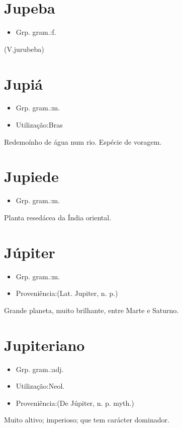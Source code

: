 \documentclass{article}
\begin{document}
\section{Jupeba}
\begin{itemize}
\item {Grp. gram.:f.}
\end{itemize}
(V.jurubeba)
\section{Jupiá}
\begin{itemize}
\item {Grp. gram.:m.}
\end{itemize}
\begin{itemize}
\item {Utilização:Bras}
\end{itemize}
Redemoínho de água num rio.
Espécie de voragem.
\section{Jupiede}
\begin{itemize}
\item {Grp. gram.:m.}
\end{itemize}
Planta resedácea da Índia oriental.
\section{Júpiter}
\begin{itemize}
\item {Grp. gram.:m.}
\end{itemize}
\begin{itemize}
\item {Proveniência:(Lat. \textunderscore Jupiter\textunderscore , n. p.)}
\end{itemize}
Grande planeta, muito brilhante, entre Marte e Saturno.
\section{Jupiteriano}
\begin{itemize}
\item {Grp. gram.:adj.}
\end{itemize}
\begin{itemize}
\item {Utilização:Neol.}
\end{itemize}
\begin{itemize}
\item {Proveniência:(De \textunderscore Júpiter\textunderscore , n. p. myth.)}
\end{itemize}
Muito altivo; imperioso; que tem carácter dominador.
\end{document}
